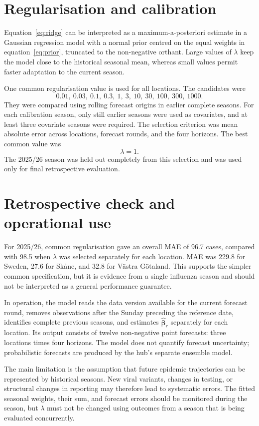 \documentclass[10pt,a4paper]{article}
\begin{document}
\section*{Regularisation and calibration}

Equation~\eqref{eq:ridge} can be interpreted as a maximum-a-posteriori
estimate in a Gaussian regression model with a normal prior centred on the
equal weights in equation~\eqref{eq:prior}, truncated to the non-negative
orthant. Large values of $\lambda$ keep the model close to the historical
seasonal mean, whereas small values permit faster adaptation to the current
season.

One common regularisation value is used for all locations. The candidates
were
\[
  0.01,\ 0.03,\ 0.1,\ 0.3,\ 1,\ 3,\ 10,\ 30,\ 100,\ 300,\ 1000.
\]
They were compared using rolling forecast origins in earlier complete
seasons. For each calibration season, only still earlier seasons were used as
covariates, and at least three covariate seasons were required. The selection
criterion was mean absolute error across locations, forecast rounds, and the
four horizons. The best common value was
\[
  \boxed{\lambda=1}.
\]
The 2025/26 season was held out completely from this selection and was used
only for final retrospective evaluation.

\section*{Retrospective check and operational use}

For 2025/26, common regularisation gave an overall MAE of 96.7 cases,
compared with 98.5 when $\lambda$ was selected separately for each location.
MAE was 229.8 for Sweden, 27.6 for Skåne, and 32.8 for Västra Götaland. This
supports the simpler common specification, but it is evidence from a single
influenza season and should not be interpreted as a general performance
guarantee.

In operation, the model reads the data version available for the current
forecast round, removes observations after the Sunday preceding the reference
date, identifies complete previous seasons, and estimates
$\widehat{\boldsymbol\beta}_r$ separately for each location. Its output consists
of twelve non-negative point forecasts: three locations times four horizons.
The model does not quantify forecast uncertainty; probabilistic forecasts are
produced by the hub's separate ensemble model.

The main limitation is the assumption that future epidemic trajectories can
be represented by historical seasons. New viral variants, changes in testing,
or structural changes in reporting may therefore lead to systematic errors.
The fitted seasonal weights, their sum, and forecast errors should be
monitored during the season, but $\lambda$ must not be changed using outcomes
from a season that is being evaluated concurrently.
\end{document}

